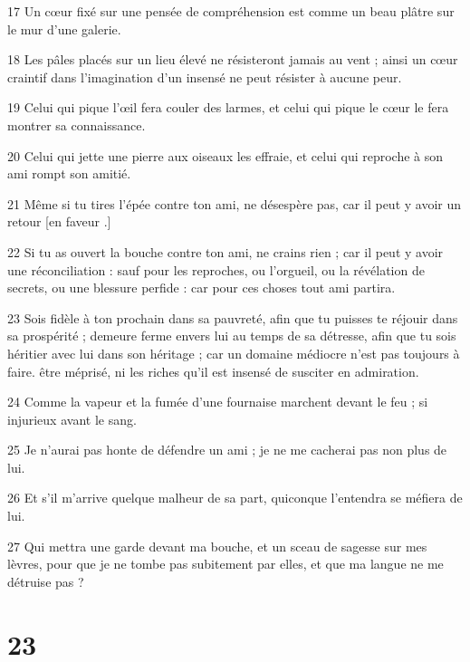 \par 17 Un cœur fixé sur une pensée de compréhension est comme un beau plâtre sur le mur d'une galerie.
\par 18 Les pâles placés sur un lieu élevé ne résisteront jamais au vent ; ainsi un cœur craintif dans l'imagination d'un insensé ne peut résister à aucune peur.
\par 19 Celui qui pique l'œil fera couler des larmes, et celui qui pique le cœur le fera montrer sa connaissance.
\par 20 Celui qui jette une pierre aux oiseaux les effraie, et celui qui reproche à son ami rompt son amitié.
\par 21 Même si tu tires l'épée contre ton ami, ne désespère pas, car il peut y avoir un retour [en faveur .]
\par 22 Si tu as ouvert la bouche contre ton ami, ne crains rien ; car il peut y avoir une réconciliation : sauf pour les reproches, ou l'orgueil, ou la révélation de secrets, ou une blessure perfide : car pour ces choses tout ami partira.
\par 23 Sois fidèle à ton prochain dans sa pauvreté, afin que tu puisses te réjouir dans sa prospérité ; demeure ferme envers lui au temps de sa détresse, afin que tu sois héritier avec lui dans son héritage ; car un domaine médiocre n'est pas toujours à faire. être méprisé, ni les riches qu'il est insensé de susciter en admiration.
\par 24 Comme la vapeur et la fumée d'une fournaise marchent devant le feu ; si injurieux avant le sang.
\par 25 Je n'aurai pas honte de défendre un ami ; je ne me cacherai pas non plus de lui.
\par 26 Et s'il m'arrive quelque malheur de sa part, quiconque l'entendra se méfiera de lui.
\par 27 Qui mettra une garde devant ma bouche, et un sceau de sagesse sur mes lèvres, pour que je ne tombe pas subitement par elles, et que ma langue ne me détruise pas ?

\chapter{23}

